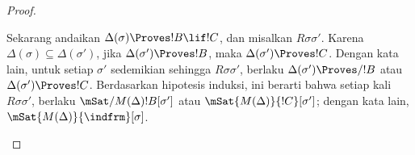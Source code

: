 \documentclass[../../../include/open-logic-section]{subfiles}
\begin{document}
\begin{proof}
\begin{enumerate}
{      Sekarang andaikan $\Delta(\sigma)\Proves !B\lif !C$, dan misalkan
      $R\sigma\sigma'$. Karena
      $\Delta(\sigma)\subseteq\Delta(\sigma')$, jika
      $\Delta(\sigma')\Proves !B$, maka $\Delta(\sigma')\Proves !C$.
      Dengan kata lain, untuk setiap $\sigma'$ sedemikian sehingga
      $R\sigma\sigma'$, berlaku $\Delta(\sigma')\Proves/ !B$ atau
      $\Delta(\sigma')\Proves !C$. Berdasarkan hipotesis induksi, ini
      berarti bahwa setiap kali $R\sigma\sigma'$, berlaku
      $\mSat/{M(\Delta)}{!B}[\sigma']$ atau
      $\mSat{M(\Delta)}{!C}[\sigma']$; dengan kata lain,
      $\mSat{M(\Delta)}{\indfrm}[\sigma]$.}
  \end{enumerate}
\end{proof}
\end{document}
